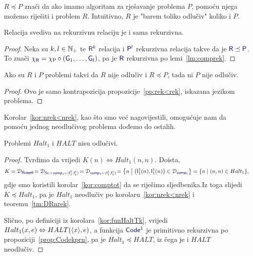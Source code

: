 $R\preceq P$ znači da ako imamo algoritam za rješavanje problema $P$, pomoću njega možemo riješiti i problem $R$. Intuitivno, $R$ je "barem toliko odlučiv" koliko i $P$.

\begin{propozicija}[{name=[svedivost čuva rekurzivnost]}]\label{pp:rek<rek}
Relacija svediva na rekurzivnu relaciju je i sama rekurzivna.
\end{propozicija}
\begin{proof}
Neka su $k,l\in{\mathbb N}_+$ te $\f R^k$ relacija i $\f P^l$ rekurzivna relacija takve da je $\f R\preceq\f P$.\\
	To znači $\chi_{\f R}=\chi_{\f P}\circ(\f G_1,\dotsc,\f G_l)$, pa je $\f R$ rekurzivna po lemi~\ref{lm:comprek}.
\end{proof}

\begin{korolar}[{name=[inverz svedivosti čuva neodlučivost]}]\label{kor:nrek<nrek}
Ako su $R$ i $P$ problemi takvi da $R$ nije odlučiv i $R\preceq P$, tada ni $P$ nije odlučiv\!.
\end{korolar}
\begin{proof}
Ovo je samo kontrapozicija propozicije~\ref{pp:rek<rek}, iskazana jezikom problema.
\end{proof}


Korolar~\ref{kor:nrek<nrek}, kao što smo već nagovijestili, omogućuje nam da pomoću jednog neodlučivog problema dođemo do ostalih.

\begin{propozicija}[{name=[neodlučivost problema zaustavljanja za RAM-strojeve]}]\label{pp:Haltnodl}
Problemi $Halt_1$ i $HALT$ nisu odlučivi.
\end{propozicija}
\begin{proof}
Tvrdimo da vrijedi $K(n)\Leftrightarrow Halt_1(n,n)$. Doista,
\begin{equation*}
    K=\dom{\f{Russell}}\!=\dom{\f{Sc}\,\circ\,\f{comp}_1\circ\,(\f I_1^1,\f I_1^1)}\!=\dom{\f{comp}_1\circ\,(\f I_1^1,\f I_1^1)}\!
    =\left\{n\;\middle\vert\;\bigl(\f I_1^1(n),\f I_1^1(n)\bigr)\in\dom{\f{comp}_1}\right\}
    =\{n\mid(n,n)\in Halt_1\}\text,
\end{equation*}
gdje smo koristili korolar~\ref{kor:comptot} da se riješimo sljedbenika.\newline Iz toga slijedi $K\preceq Halt_1$, pa je $Halt_1$ neodlučiv po korolaru~\ref{kor:nrek<nrek} i teoremu~\ref{tm:DRnrek}.

	Slično, po definiciji iz korolara~\ref{kor:funHaltTk}, vrijedi $Halt_1(x,e)\Leftrightarrow HALT(\langle x\rangle,e)$, a funkcija $\f{Code}^1$ je primitivno rekurzivna po propoziciji~\ref{prop:Codekprn}, pa je $Halt_1\!\preceq HALT$, iz čega je i $HALT$ neodlučiv\!.
\end{proof}

